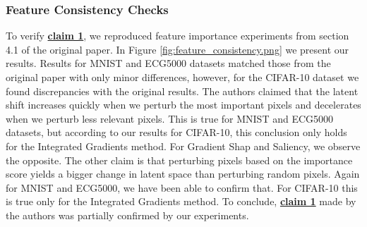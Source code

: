 \subsubsection{Feature Consistency Checks}

To verify \textbf{\hyperref[claim1]{claim 1}}, we reproduced feature importance experiments from section 4.1 of the original paper. In Figure \ref{fig:feature_consistency.png} we present our results. Results for MNIST and ECG5000 datasets matched those from the original paper with only minor differences, however, for the CIFAR-10 dataset we found discrepancies with the original results. The authors claimed that the latent shift increases quickly when we perturb the most important pixels and decelerates when we perturb less relevant pixels. This is true for MNIST and ECG5000 datasets, but according to our results for CIFAR-10, this conclusion only holds for the Integrated Gradients method. For Gradient Shap and Saliency, we observe the opposite. The other claim is that perturbing pixels based on the importance score yields a bigger change in latent space than perturbing random pixels. Again for MNIST and ECG5000, we have been able to confirm that. For CIFAR-10 this is true only for the Integrated Gradients method. To conclude, \textbf{\hyperref[claim1]{claim 1}} made by the authors was partially confirmed by our experiments.



